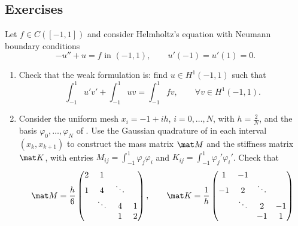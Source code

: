\subsection*{Exercises}
\begin{exercises}
    \label{ex:FEM d=1 linear Neumann}
    Let $f \in C([-1,1])$ and consider Helmholtz's equation with Neumann boundary conditions
    \begin{equation*}
        -u'' + u = f \text{ in } (-1,1), \qquad u'(-1) = u'(1) = 0.
    \end{equation*}
    \begin{enumerate}[label=\roman*)]
        \item Check that the weak formulation is: find $u \in H^1(-1,1)$ such that
              \begin{equation*}
                  \int_{-1}^1 u' v' + \int_{-1}^1 u v = \int_{-1}^1 f v, \qquad \forall v \in H^1(-1,1).
              \end{equation*}
        \item Consider the uniform mesh $x_i = -1 + ih$, $i = 0, \dots, N$, with $h = \frac 2 N$, and the basis $\varphi_0, \dots, \varphi_N$ of .
              Use the Gaussian quadrature of  in each interval $(x_k, x_{k+1})$ to construct the mass matrix $\mat M$ and the stiffness matrix $\mat K$, with entries \mbox{$M_{ij} = \int_{-1}^1 \varphi_j \varphi_i$} and \mbox{$K_{ij} = \int_{-1}^1 \varphi_j' \varphi_i'$}.
              Check that
              \begin{equation*}
                  \mat M = \frac h 6
                  \begin{pmatrix}
                      2 & 1      &        &   \\
                      1 & 4      & \ddots &   \\
                        & \ddots & 4      & 1 \\
                        &        & 1      & 2
                  \end{pmatrix},
                  \qquad
                  \mat K = \frac 1 h
                  \begin{pmatrix}
                      1  & -1     &        &    \\
                      -1 & 2      & \ddots &    \\
                         & \ddots & 2      & -1 \\
                         &        & -1     & 1

\end{pmatrix}
\end{equation*}
\end{enumerate}
\end{exercises}
